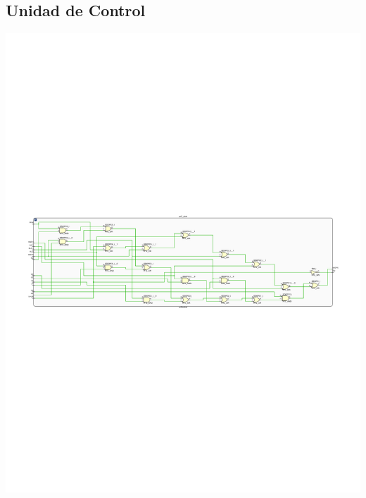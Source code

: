 \documentclass[8pt,executivepaper]{article}
\begin{document}
\subsection{Unidad de Control}
\begin{center}
  \includegraphics[scale=0.75]{rtl/control.pdf}
\end{center}
\end{document}
